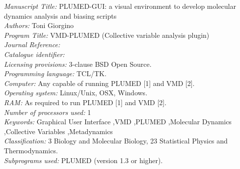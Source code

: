 \documentclass[preprint,12pt]{elsarticle}
\newcounter{bla}
\newcommand{\mytitle}{PLUMED-GUI: a visual environment to develop
  molecular dynamics analysis and biasing scripts}
\begin{document}
\begin{small}
\noindent
{\em Manuscript Title:}                                       
 \mytitle \\
{\em Authors:}                                                
 Toni Giorgino \\
{\em Program Title:}                                          
 VMD-PLUMED (Collective variable analysis plugin) \\
{\em Journal Reference:}                                      \\
{\em Catalogue identifier:}                                   \\
{\em Licensing provisions:}                                   
 3-clause BSD Open Source. \\
{\em Programming language:}                                   
 TCL/TK. \\
{\em Computer:}                                               
 Any capable of running  PLUMED [1] and VMD [2]. \\
{\em Operating system:}                                       
 Linux/Unix, OSX, Windows. \\
{\em RAM:}                                               
 As required to run  PLUMED [1] and VMD [2]. \\
{\em Number of processors used:}                              
 1 \\
{\em Keywords:} Graphical User Interface \sep VMD \sep PLUMED \sep Molecular Dynamics \sep Collective Variables \sep Metadynamics \\
{\em Classification:}                                         
  3 Biology and Molecular Biology, 23 Statistical Physics and Thermodynamics. \\
{\em Subprograms used:}                                       
  PLUMED (version 1.3 or higher). \\

\end{small}
\end{document}
